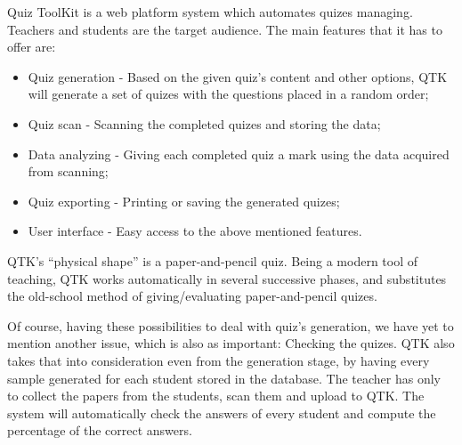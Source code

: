 Quiz ToolKit is a web platform system which automates quizes managing. Teachers and students are the target audience. The main features that it has to offer are:
\begin{itemize}
  \item Quiz generation - Based on the given quiz’s content and other options, QTK will generate a set of quizes with the questions placed in a random order;
  \item Quiz scan - Scanning the completed quizes and storing the data;
  \item Data analyzing - Giving each completed quiz a mark using the data acquired from scanning;
  \item Quiz exporting - Printing or saving the generated quizes;
  \item User interface - Easy access to the above mentioned features.
\end{itemize}

QTK's ``physical shape'' is a paper-and-pencil quiz. Being a modern tool of teaching, QTK works automatically in several successive phases, and substitutes the old-school method of giving/evaluating paper-and-pencil quizes. 

Of course, having these possibilities to deal with quiz’s generation, we have yet to mention another issue, which is also as important: Checking the quizes. QTK also takes that into consideration even from the generation stage, by having every sample generated for each student stored in the database. The teacher has only to collect the papers from the students, scan them and upload to QTK. The system will automatically check the answers of every student and compute the percentage of the correct answers.


\clearpage
